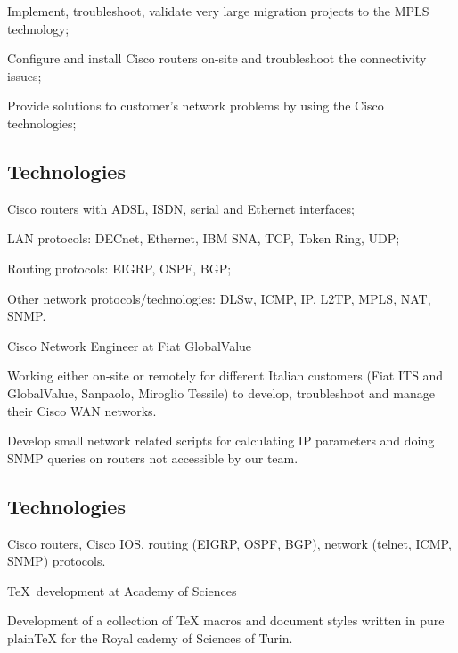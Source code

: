 \item{\bdot} Implement, troubleshoot, validate very large migration projects
   to the MPLS technology;
\item{\bdot} Configure and install Cisco routers on-site and troubleshoot the
   connectivity issues;
\item{\bdot} Provide solutions to customer's network problems by using the Cisco
   technologies;

\subsection{Technologies}

\item{\bdot} Cisco routers with ADSL, ISDN, serial and Ethernet interfaces;
\item{\bdot} LAN protocols: DECnet, Ethernet, IBM SNA, TCP, Token Ring, UDP;
\item{\bdot} Routing protocols: EIGRP, OSPF, BGP;
\item{\bdot} Other network protocols/technologies: DLSw, ICMP, IP, L2TP, 
   MPLS, NAT, SNMP.


   {Cisco Network Engineer at Fiat GlobalValue}

Working either on-site or remotely for different Italian customers (Fiat ITS
and GlobalValue, Sanpaolo, Miroglio Tessile) to develop, troubleshoot and
manage their Cisco WAN networks.

Develop small network related scripts for calculating IP parameters and doing
SNMP queries on routers not accessible by our team.

\subsection{Technologies}

Cisco routers, Cisco IOS, routing (EIGRP, OSPF, BGP),
network (telnet, ICMP, SNMP) protocols.
   

   {\TeX\ development at Academy of Sciences}

Development of a collection of TeX macros and document styles written in pure plainTeX
for the Royal cademy of Sciences of Turin.

